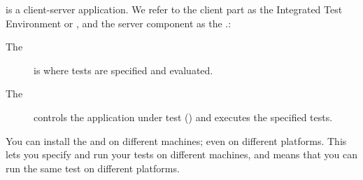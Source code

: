 
\app{} is a client-server application. We refer to the client part as the Integrated Test Environment or \ite{}, and the server component as the \gdagent{}.:  
\begin{description}
\item[The \ite{}]{is where tests are specified and evaluated.}
\item [The \gdagent{}]{controls the application under test (\gdaut{}) and executes the specified tests. }
\end{description}

 You can install the \ite{} and \gdagent{} on different machines; even on different platforms. This lets you specify and run  your tests on different machines, and means that you can run the same test on different platforms. 
